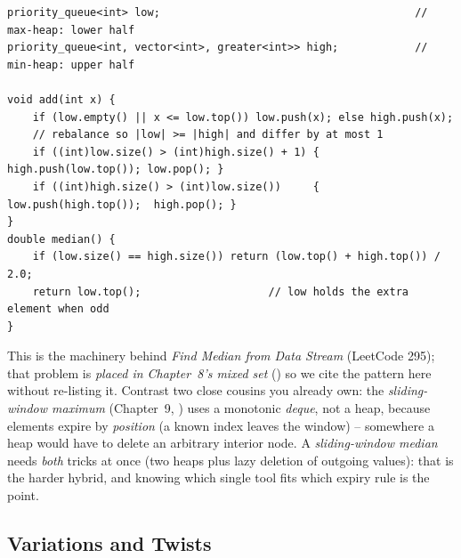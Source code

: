 \begin{lstlisting}[caption={Two-heap running median: a max-heap (low) and min-heap (high) balanced to within one}, label={lst:c07-median}]
priority_queue<int> low;                                        // max-heap: lower half
priority_queue<int, vector<int>, greater<int>> high;            // min-heap: upper half

void add(int x) {
    if (low.empty() || x <= low.top()) low.push(x); else high.push(x);
    // rebalance so |low| >= |high| and differ by at most 1
    if ((int)low.size() > (int)high.size() + 1) { high.push(low.top()); low.pop(); }
    if ((int)high.size() > (int)low.size())     { low.push(high.top());  high.pop(); }
}
double median() {
    if (low.size() == high.size()) return (low.top() + high.top()) / 2.0;
    return low.top();                    // low holds the extra element when odd
}
\end{lstlisting}

\begin{notebox}
This is the machinery behind \emph{Find Median from Data Stream} (LeetCode 295); that problem is \emph{placed
in Chapter~8's mixed set} () so we cite the pattern here without re-listing it. Contrast two close
cousins you already own: the \emph{sliding-window maximum} (Chapter~9, ) uses a monotonic
\emph{deque}, not a heap, because elements expire by \emph{position} (a known index leaves the window) --
somewhere a heap would have to delete an arbitrary interior node. A \emph{sliding-window median} needs
\emph{both} tricks at once (two heaps plus lazy deletion of outgoing values): that is the harder hybrid, and
knowing which single tool fits which expiry rule is the point.
\end{notebox}

\subsection{Variations and Twists}

